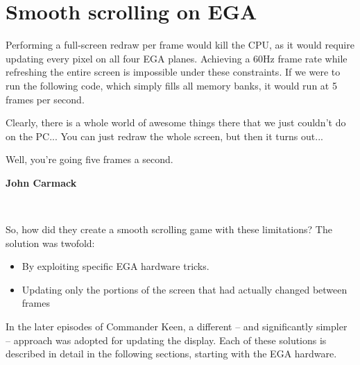 \documentclass[book.tex]{subfiles}
\begin{document}
\section{Smooth scrolling on EGA}
\label{section:adaptive_tile_refresh}
Performing a full-screen redraw per frame would kill the CPU, as it would require updating every pixel on all four EGA planes. Achieving a 60Hz frame rate while refreshing the entire screen is impossible under these constraints. If we were to run the following code, which simply fills all memory banks, it would run at 5 frames per second.\\

\par
\begin{minipage}{\textwidth}
  
  \end{minipage}
  \label{ega_write}

\bigskip
\par
\begin{fancyquotes}
Clearly, there is a whole world of awesome things there that we just couldn't do on the PC...
You can just redraw the whole screen, but then it turns out...\\
\par
Well, you're going five frames a second.\\

\par
\textbf{John Carmack\protect\footnotemark}
\end{fancyquotes}\\
\addtocounter{footnote}{-1}

\par
So, how did they create a smooth scrolling game with these limitations? The solution was twofold:
\begin{itemize}
  \item By exploiting specific EGA hardware tricks.
  \item Updating only the portions of the screen that had actually changed between frames
\end{itemize}

\par
In the later episodes of Commander Keen, a different -- and significantly simpler -- approach was adopted for updating the display. Each of these solutions is described in detail in the following sections, starting with the EGA hardware.
\end{document}
